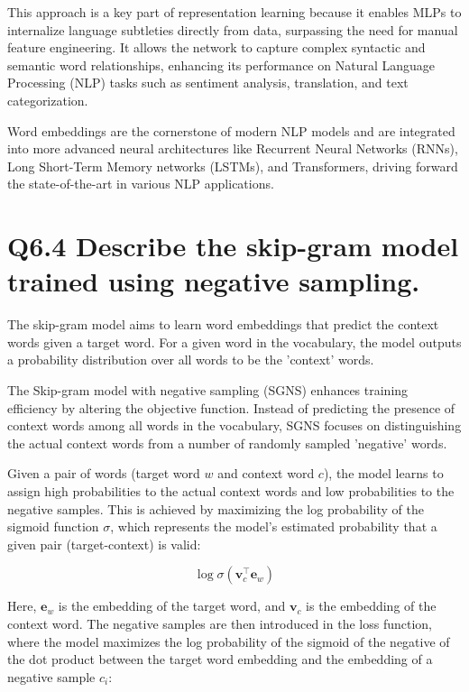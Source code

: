 \documentclass[11pt]{article}
\begin{document}
This approach is a key part of representation learning because it enables MLPs to internalize language subtleties directly from data, surpassing the need for manual feature engineering. It allows the network to capture complex syntactic and semantic word relationships, enhancing its performance on Natural Language Processing (NLP) tasks such as sentiment analysis, translation, and text categorization.

Word embeddings are the cornerstone of modern NLP models and are integrated into more advanced neural architectures like Recurrent Neural Networks (RNNs), Long Short-Term Memory networks (LSTMs), and Transformers, driving forward the state-of-the-art in various NLP applications.


\section{Q6.4 Describe the skip-gram model trained using negative sampling.}

The skip-gram model aims to learn word embeddings that predict the context words given a target word. For a given word in the vocabulary, the model outputs a probability distribution over all words to be the 'context' words.

The Skip-gram model with negative sampling (SGNS) enhances training efficiency by altering the objective function. Instead of predicting the presence of context words among all words in the vocabulary, SGNS focuses on distinguishing the actual context words from a number of randomly sampled 'negative' words.

Given a pair of words (target word $w$ and context word $c$), the model learns to assign high probabilities to the actual context words and low probabilities to the negative samples. This is achieved by maximizing the log probability of the sigmoid function $\sigma$, which represents the model's estimated probability that a given pair (target-context) is valid:

\begin{equation}
    \log \sigma(\mathbf{v}_c^\top \mathbf{e}_w)
\end{equation}

Here, $\mathbf{e}_w$ is the embedding of the target word, and $\mathbf{v}_c$ is the embedding of the context word. The negative samples are then introduced in the loss function, where the model maximizes the log probability of the sigmoid of the negative of the dot product between the target word embedding and the embedding of a negative sample $c_i$:
\end{document}
